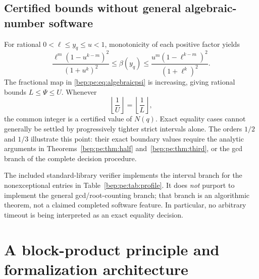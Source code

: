 \documentclass[11pt]{article}
\numberwithin{equation}{section}
\theoremstyle{definition}
\theoremstyle{remark}
\begin{document}
\subsection{Certified bounds without general algebraic-number software}
For rational $0<\ell\leq y_q\leq u<1$, monotonicity of each positive
factor yields
\begin{equation}
 \frac{\ell^m(1-u^{k-m})^2}{(1+u^k)^2}
 \leq\beta(y_q)\leq
 \frac{u^m(1-\ell^{k-m})^2}{(1+\ell^k)^2}.\label{bep:pe:eq:betabounds}
\end{equation}
The fractional map in \eqref{bep:pe:eq:algebraicpsi} is increasing, giving
rational bounds $L\leq\Psi\leq U$. Whenever
\[
 \left\lfloor\frac1U\right\rfloor
 =\left\lfloor\frac1L\right\rfloor,
\]
the common integer is a certified value of $N(q)$. Exact equality
cases cannot generally be settled by progressively tighter strict
intervals alone. The orders $1/2$ and $1/3$ illustrate this point:
their exact boundary values require the analytic arguments in
Theorems~\ref{bep:pe:thm:half} and~\ref{bep:pe:thm:third}, or the gcd branch of the
complete decision procedure.

\begin{table}[tbp]
\centering

\caption{Fixed-order dimension thresholds. Decimal profile values are
approximations. The integers are certified using rational root isolation
and outward bounds, except the two equality cases $1/2$ and $1/3$,
which follow from exact analytic formulas.}
\label{bep:pe:tab:profile}
\end{table}

The included standard-library verifier implements the interval branch
for the nonexceptional entries in Table~\ref{bep:pe:tab:profile}. It does
\emph{not} purport to implement the general gcd/root-counting branch;
that branch is an algorithmic theorem, not a claimed completed software
feature. In particular, no arbitrary timeout is being interpreted as
an exact equality decision.

\section{A block-product principle and formalization architecture}\label{bep:pe:sec:blocks}
\end{document}
